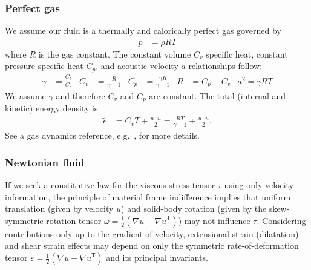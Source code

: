 \documentclass[letterpaper,11pt,nointlimits,reqno]{amsart}
\newcommand{\trans}[1]{{#1}^{\ensuremath{\mathsf{T}}}}
\begin{document}
\subsubsection{Perfect gas}

We assume our fluid is a thermally and calorically perfect gas governed by
\begin{align}
  \label{eq:perfectgaseos}
  p &= \rho{} R T
\end{align}
where $R$ is the gas constant. The constant volume $C_{v}$ specific heat,
constant pressure specific heat $C_{p}$, and acoustic velocity $a$
relationships follow:
\begin{align}
  \label{eq:perfectgasrelations}
  \gamma &= \frac{C_{p}}{C_{v}}
  &
  C_{v} &= \frac{R}{\gamma - 1}
  &
  C_{p} &= \frac{\gamma{}R}{\gamma-1}
  &
  R &= C_{p} - C_{v}
  &
  a^{2} = \gamma{}RT
\end{align}
We assume $\gamma$ and therefore $C_{v}$ and $C_{p}$ are constant.
The total (internal and kinetic) energy density is
\begin{align}
  \label{eq:perfectgastotalenergy}
  \tilde{e} &= C_{v} T + \frac{u\cdot{}u}{2}
     = \frac{RT}{\gamma-1} + \frac{u\cdot{}u}{2}
  .
\end{align}
See a gas dynamics reference, e.g.~\cite{LiepmannRoshko2002}, for more details.

\subsubsection{Newtonian fluid}

If we seek a constitutive law for the viscous stress tensor $\tau$
using only velocity information, the principle of material frame
indifference implies that uniform translation (given by velocity $u$)
and solid-body rotation (given by the skew-symmetric rotation tensor
$\omega=\frac{1}{2}\left( \nabla{}u-\trans{\nabla{}u} \right)$)
may not influence $\tau$.  Considering contributions only up to the
gradient of velocity, extensional strain (dilatation) and shear strain
effects may depend on only the symmetric rate-of-deformation tensor
$\varepsilon=\frac{1}{2}\left( \nabla{}u+\trans{\nabla{}u}\right)$
and its principal invariants.
\end{document}
